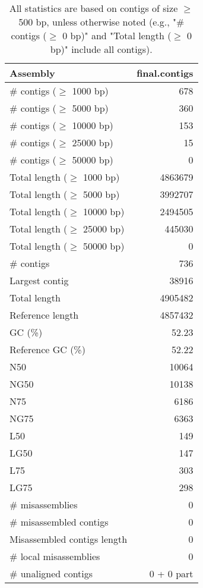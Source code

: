 \documentclass[12pt,a4paper]{article}
\begin{document}
\begin{table}[ht]
\begin{center}
\caption{All statistics are based on contigs of size $\geq$ 500 bp, unless otherwise noted (e.g., "\# contigs ($\geq$ 0 bp)" and "Total length ($\geq$ 0 bp)" include all contigs).}
\begin{tabular}{|l*{1}{|r}|}
\hline
Assembly & final.contigs \\ \hline
\# contigs ($\geq$ 1000 bp) & 678 \\ \hline
\# contigs ($\geq$ 5000 bp) & 360 \\ \hline
\# contigs ($\geq$ 10000 bp) & 153 \\ \hline
\# contigs ($\geq$ 25000 bp) & 15 \\ \hline
\# contigs ($\geq$ 50000 bp) & 0 \\ \hline
Total length ($\geq$ 1000 bp) & 4863679 \\ \hline
Total length ($\geq$ 5000 bp) & 3992707 \\ \hline
Total length ($\geq$ 10000 bp) & 2494505 \\ \hline
Total length ($\geq$ 25000 bp) & 445030 \\ \hline
Total length ($\geq$ 50000 bp) & 0 \\ \hline
\# contigs & 736 \\ \hline
Largest contig & 38916 \\ \hline
Total length & 4905482 \\ \hline
Reference length & 4857432 \\ \hline
GC (\%) & 52.23 \\ \hline
Reference GC (\%) & 52.22 \\ \hline
N50 & 10064 \\ \hline
NG50 & 10138 \\ \hline
N75 & 6186 \\ \hline
NG75 & 6363 \\ \hline
L50 & 149 \\ \hline
LG50 & 147 \\ \hline
L75 & 303 \\ \hline
LG75 & 298 \\ \hline
\# misassemblies & 0 \\ \hline
\# misassembled contigs & 0 \\ \hline
Misassembled contigs length & 0 \\ \hline
\# local misassemblies & 0 \\ \hline
\# unaligned contigs & 0 + 0 part \\ \hline

\end{tabular}
\end{center}
\end{table}
\end{document}
